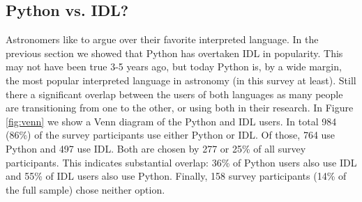 \subsection{Python vs. IDL?}

Astronomers like to argue over their favorite interpreted language. In the previous section we showed that Python has overtaken IDL in popularity. This may not have been true 3-5 years ago, but today Python is, by a wide margin, the most popular interpreted language in astronomy (in this survey at least). Still there a significant overlap between the users of both languages as many people are transitioning from one to the other, or using both in their research. In Figure \ref{fig:venn} we show a Venn diagram of the Python and IDL users. In total 984 (86\%) of the survey participants use either Python or IDL. Of those, 764 use Python and 497 use IDL. Both are chosen by 277 or 25\% of all survey participants. This indicates substantial overlap: 36\% of Python users also use IDL and 55\% of IDL users also use Python. Finally, 158 survey participants (14\% of the full sample) chose neither option.
